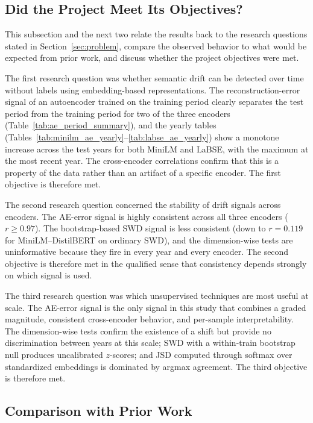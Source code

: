 \documentclass[conference]{IEEEtran}
\begin{document}
\subsection{Did the Project Meet Its Objectives?}
\label{sec:analysis}

This subsection and the next two relate the results back to the research questions stated in Section~\ref{sec:problem}, compare the observed behavior to what would be expected from prior work, and discuss whether the project objectives were met.

The first research question was whether semantic drift can be detected over time without labels using embedding-based representations. The reconstruction-error signal of an autoencoder trained on the training period clearly separates the test period from the training period for two of the three encoders (Table~\ref{tab:ae_period_summary}), and the yearly tables (Tables~\ref{tab:minilm_ae_yearly}--\ref{tab:labse_ae_yearly}) show a monotone increase across the test years for both MiniLM and LaBSE, with the maximum at the most recent year. The cross-encoder correlations confirm that this is a property of the data rather than an artifact of a specific encoder. The first objective is therefore met.

The second research question concerned the stability of drift signals across encoders. The AE-error signal is highly consistent across all three encoders ($r \geq 0.97$). The bootstrap-based SWD signal is less consistent (down to $r = 0.119$ for MiniLM--DistilBERT on ordinary SWD), and the dimension-wise tests are uninformative because they fire in every year and every encoder. The second objective is therefore met in the qualified sense that consistency depends strongly on which signal is used.

The third research question was which unsupervised techniques are most useful at scale. The AE-error signal is the only signal in this study that combines a graded magnitude, consistent cross-encoder behavior, and per-sample interpretability. The dimension-wise tests confirm the existence of a shift but provide no discrimination between years at this scale; SWD with a within-train bootstrap null produces uncalibrated $z$-scores; and JSD computed through softmax over standardized embeddings is dominated by argmax agreement. The third objective is therefore met.

\subsection{Comparison with Prior Work}
\end{document}
